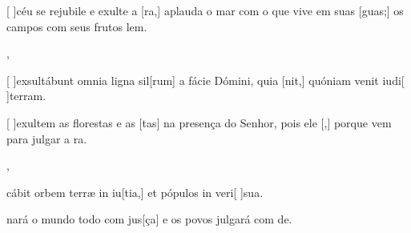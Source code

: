 {    {\item {}[ ]{céu} se rejubile e exulte a [ra,] aplauda o mar com o que vive em suas [guas;] os campos com seus frutos lem.~\Antiphona},
  {\item {}[ ]{ex}sultábunt omnia ligna sil[rum] a fácie Dómini, quia [nit,] quóniam venit iudi[ ]{ter}ram.~\Antiphona}%
    {\item {}[ ]{e}xultem as florestas e as [tas] na presença do Senhor, pois ele [,] porque vem para julgar a ra.~\Antiphona},
  {\item {}cábit orbem terræ in iu[tia,] et pópulos in veri[ ]{su}a.~\Antiphona}%
    {\item {}nará o mundo todo com jus[ça] e os povos julgará com de.~\Antiphona}
}